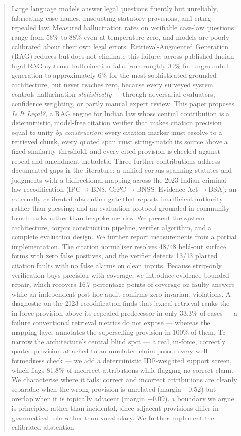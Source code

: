 \documentclass[conference]{IEEEtran}
\begin{document}
\begin{abstract}
Large language models answer legal questions fluently but unreliably, fabricating case names, misquoting statutory provisions, and citing repealed law. Measured hallucination rates on verifiable case-law questions range from 58\% to 88\% even at temperature zero, and models are poorly calibrated about their own legal errors. Retrieval-Augmented Generation (RAG) reduces but does not eliminate this failure: across published Indian legal RAG systems, hallucination falls from roughly 30\% for ungrounded generation to approximately 6\% for the most sophisticated grounded architecture, but never reaches zero, because every surveyed system controls hallucination \emph{statistically} — through adversarial evaluators, confidence weighting, or partly manual expert review. This paper proposes \textit{Is It Legal?}, a RAG engine for Indian law whose central contribution is a deterministic, model-free citation verifier that makes citation precision equal to unity \emph{by construction}: every citation marker must resolve to a retrieved chunk, every quoted span must string-match its source above a fixed similarity threshold, and every cited provision is checked against repeal and amendment metadata. Three further contributions address documented gaps in the literature: a unified corpus spanning statutes and judgments with a bidirectional mapping across the 2023 Indian criminal-law recodification (IPC$\rightarrow$BNS, CrPC$\rightarrow$BNSS, Evidence Act$\rightarrow$BSA); an externally calibrated abstention gate that reports insufficient authority rather than guessing; and an evaluation protocol grounded in community benchmarks rather than bespoke metrics. We present the system architecture, corpus construction pipeline, verifier algorithm, and a complete evaluation design. We further report measurements from a partial implementation. The citation normaliser resolves 48/48 held-out surface forms with zero false positives, and the verifier detects 13/13 planted citation faults with no false alarms on clean inputs. Because strip-only verification buys precision with coverage, we introduce evidence-bounded repair, which recovers 16.7 percentage points of coverage on faulty answers while an independent post-hoc audit confirms zero invariant violations. A diagnostic on the 2023 recodification finds that lexical retrieval ranks the in-force provision above its repealed predecessor in only 33.3\% of cases --- a failure conventional retrieval metrics do not expose --- whereas the mapping layer annotates the superseding provision in 100\% of them. To narrow the architecture's central blind spot --- a real, in-force, correctly quoted provision attached to an unrelated claim passes every well-formedness check --- we add a deterministic IDF-weighted support screen, which flags 81.8\% of incorrect attributions while flagging no correct claim. We characterise where it fails: correct and incorrect attributions are cleanly separable when the wrong provision is unrelated (margin $+0.52$) but overlap when it is topically adjacent (margin $-0.09$), a boundary we argue is principled rather than incidental, since adjacent provisions differ in grammatical role rather than vocabulary. We further implement the calibrated abstention 
\end{abstract}
\end{document}
